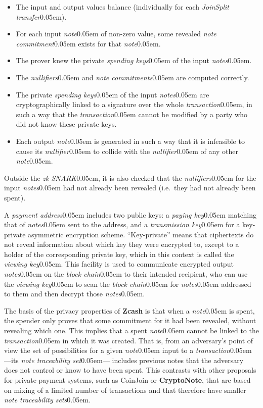 \documentclass{article}
\renewcommand{\emph}[1]{\hspace{0.15em}{\fontfamily{pnc}\selectfont\scalebox{1.02}[0.999]{\textit{#1}}}\hspace{0.02em}}
\newcommand{\term}[1]{\textsl{#1}\kern 0.05em\xspace}
\newcommand{\termbf}[1]{\textbf{#1}\xspace}
\newcommand{\Zcash}{\termbf{Zcash}}
\newcommand{\CryptoNote}{\termbf{CryptoNote}}
\newcommand{\note}{\term{note}}
\newcommand{\notes}{\term{notes}}
\newcommand{\noteCommitment}{\term{note commitment}}
\newcommand{\noteCommitments}{\term{note commitments}}
\newcommand{\noteTraceabilitySet}{\term{note traceability set}}
\newcommand{\noteTraceabilitySets}{\term{note traceability sets}}
\newcommand{\joinSplitTransfer}{\term{JoinSplit transfer}}
\newcommand{\transaction}{\term{transaction}}
\newcommand{\blockchain}{\term{block chain}}
\newcommand{\nullifier}{\term{nullifier}}
\newcommand{\nullifiers}{\term{nullifiers}}
\newcommand{\paymentAddress}{\term{payment address}}
\newcommand{\viewingKey}{\term{viewing key}}
\newcommand{\spendingKeys}{\term{spending keys}}
\newcommand{\payingKey}{\term{paying key}}
\newcommand{\transmissionKey}{\term{transmission key}}
\newcommand{\zkSNARK}{\term{zk-SNARK}}
\begin{document}
\begin{itemize}
  \item The input and output values balance (individually for each \joinSplitTransfer).
  \item For each input \note of non-zero value, some revealed \noteCommitment
        exists for that \note.
  \item The prover knew the private \spendingKeys of the input \notes.
  \item The \nullifiers and \noteCommitments are computed correctly.
  \item The private \spendingKeys of the input \notes are cryptographically
        linked to a signature over the whole \transaction, in such a way that
        the \transaction cannot be modified by a party who did not know these
        private keys.
  \item Each output \note is generated in such a way that it is infeasible to
        cause its \nullifier to collide with the \nullifier of any other \note.
\end{itemize}

Outside the \zkSNARK, it is also checked that the \nullifiers for the input
\notes had not already been revealed (i.e.\ they had not already been spent).

A \paymentAddress includes two public keys: a \payingKey matching that of \notes
sent to the address, and a \transmissionKey for a key-private asymmetric encryption
scheme. ``Key-private'' means that ciphertexts do not reveal information about
which key they were encrypted to, except to a holder of the corresponding
private key, which in this context is called the \viewingKey. This facility is
used to communicate encrypted output \notes on the \blockchain to their
intended recipient, who can use the \viewingKey to scan the \blockchain for
\notes addressed to them and then decrypt those \notes.

The basis of the privacy properties of \Zcash is that when a \note is spent,
the spender only proves that some commitment for it had been revealed, without
revealing which one. This implies that a spent \note cannot be linked to the
\transaction in which it was created. That is, from an adversary's point of
view the set of possibilities for a given \note input to a \transaction
---its \noteTraceabilitySet--- includes \emph{all} previous notes that the
adversary does not control or know to have been spent. This contrasts with
other proposals for private payment systems, such as CoinJoin \cite{Bitcoin-CoinJoin}
or \CryptoNote \cite{vanS2014}, that are based on mixing of a limited number of
transactions and that therefore have smaller \noteTraceabilitySets.
\end{document}
